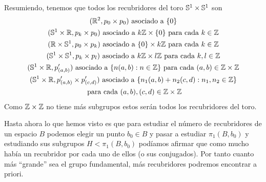 \begin{ejemplo}
\begin{enumerate}
        Resumiendo, tenemos que todos los recubridores del toro $\mathbb{S}^1\times \mathbb{S}^1$ son 
        \begin{gather*}
            (\mathbb{R}^2, p_0\times p_0) \text{ asociado a } \{0\}\\
            (\mathbb{S}^1\times \mathbb{R}, p_k\times p_0) \text{ asociado a }k\mathbb{Z} \times \{0\} \text{ para cada } k\in \mathbb{Z}\\
            (\mathbb{R}\times \mathbb{S}^1, p_0\times p_k) \text{ asociado a } \{0\}\times k\mathbb{Z} \text{ para cada } k\in \mathbb{Z}\\
            (\mathbb{S}^1 \times \mathbb{S}^1, p_k\times p_l) \text{ asociado a } k\mathbb{Z}\times l\mathbb{Z} \text{ para cada } k,l\in \mathbb{Z}\\
            (\mathbb{S}^1\times \mathbb{R}, p'_{(a,b)}) \text{ asociado a } \{n(a,b) : n\in \mathbb{Z}\} \text{ para cada } (a,b)\in \mathbb{Z}\times \mathbb{Z}\\
            (\mathbb{S}^1\times \mathbb{R}, p'_{(a,b)}\times p'_{(c,d)}) \text{ asociado a } \{n_1(a,b) + n_2(c,d) : n_1,n_2\in \mathbb{Z}\}\\ \text{ para cada } (a,b),(c,d)\in \mathbb{Z}\times \mathbb{Z}
        \end{gather*}
        Como $\mathbb{Z}\times \mathbb{Z}$ no tiene más subgrupos estos serán todos los recubridores del toro.
    \end{enumerate}
\end{ejemplo}

Hasta ahora lo que hemos visto es que para estudiar el número de recubridores de un espacio $B$ podemos elegir un punto $b_0\in B$ y pasar a estudiar $\pi_1(B,b_0)$ y estudiando sus subgrupos $H<\pi_1(B,b_0)$ podíamos afirmar que como mucho había un recubridor por cada uno de ellos (o sus conjugados). Por tanto cuanto más ``grande'' sea el grupo fundamental, más recubridores podremos encontrar a priori. \\

